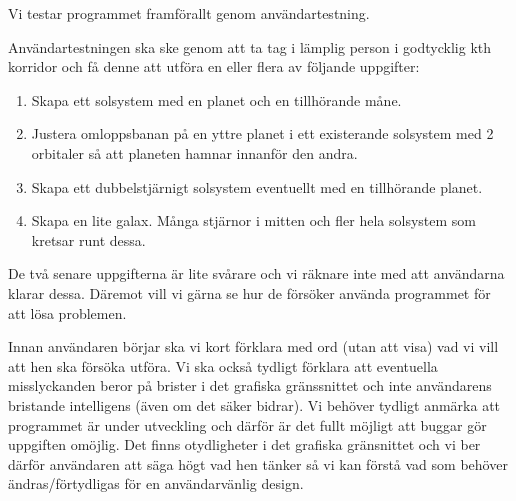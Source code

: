 
Vi testar programmet framförallt genom användartestning.

Användartestningen ska ske genom att ta tag i lämplig person
i godtycklig kth korridor och få denne att utföra en eller flera
av följande uppgifter:
\begin{enumerate}
    \item Skapa ett solsystem med en planet och en tillhörande måne.
    \item Justera omloppsbanan på en yttre planet i ett existerande
        solsystem med 2 orbitaler så att planeten hamnar innanför den andra.
    \item Skapa ett dubbelstjärnigt solsystem eventuellt med
        en tillhörande planet.
    \item Skapa en lite galax.
        Många stjärnor i mitten och fler hela solsystem som kretsar runt dessa.
\end{enumerate}
De två senare uppgifterna är lite svårare och vi räknare inte med
att användarna klarar dessa. Däremot vill vi gärna se hur de försöker använda
programmet för att lösa problemen.

Innan användaren börjar ska vi kort förklara med ord (utan att visa)
vad vi vill att hen ska försöka utföra.
Vi ska också tydligt förklara att eventuella misslyckanden
beror på brister i det grafiska gränssnittet och
inte användarens bristande intelligens (även om det säker bidrar).
Vi behöver tydligt anmärka att programmet är under utveckling och
därför är det fullt möjligt att buggar gör uppgiften omöjlig.
Det finns otydligheter i det grafiska gränsnittet och vi ber därför
användaren att säga högt vad hen tänker så vi kan förstå vad som
behöver ändras/förtydligas för en användarvänlig design.

